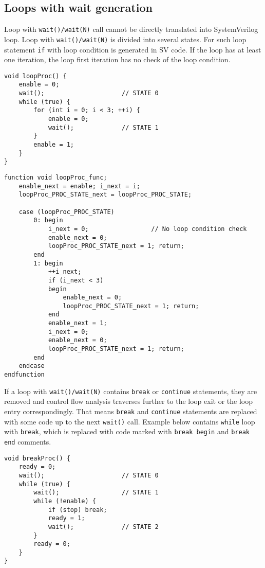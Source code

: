 \subsection{Loops with wait generation}\label{section:loop_thread}

Loop with {\tt wait()/wait(N)} call cannot be directly translated into SystemVerilog loop. Loop with {\tt wait()/wait(N)} is divided into several states. For such loop statement {\tt if} with loop condition is generated in SV code. If the loop has at least one iteration, the loop first iteration has no check of the loop condition.

\begin{lstlisting}[style=mycpp]
void loopProc() {
    enable = 0;
    wait();                     // STATE 0
    while (true) {
        for (int i = 0; i < 3; ++i) {
            enable = 0;
            wait();             // STATE 1
        }
        enable = 1;
    }
} 
\end{lstlisting}
%
\begin{lstlisting}[style=myverilog]
function void loopProc_func;
    enable_next = enable; i_next = i;
    loopProc_PROC_STATE_next = loopProc_PROC_STATE;
    
    case (loopProc_PROC_STATE)
        0: begin
            i_next = 0;					// No loop condition check
            enable_next = 0;
            loopProc_PROC_STATE_next = 1; return; 
        end
        1: begin
            ++i_next;
            if (i_next < 3)
            begin
                enable_next = 0;
                loopProc_PROC_STATE_next = 1; return; 
            end
            enable_next = 1;
            i_next = 0;
            enable_next = 0;
            loopProc_PROC_STATE_next = 1; return;   
        end
    endcase
endfunction
\end{lstlisting}

If a loop with {\tt wait()/wait(N)} contains {\tt break} or {\tt continue} statements, they are removed and control flow analysis traverses further to the loop exit or the loop entry correspondingly. That means {\tt break} and {\tt continue} statements are replaced with some code up to the next {\tt wait()} call. Example below contains {\tt while} loop with {\tt break}, which is replaced with code marked with {\tt break begin} and {\tt break end} comments.

\begin{lstlisting}[style=mycpp]
void breakProc() {
    ready = 0;
    wait();                     // STATE 0
    while (true) {
        wait();                 // STATE 1
        while (!enable) {
            if (stop) break;
            ready = 1;
            wait();             // STATE 2
        }
        ready = 0;
    }
}    
\end{lstlisting}


